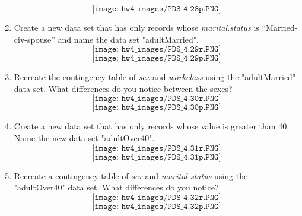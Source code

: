 \documentclass[11pt]{article}
\theoremstyle{definition}
\newcommand{\1}[1]{\mathbf{1} \left \{ #1 \right \}}
\begin{document}
\begin{enumerate}
    \[\texttt{[image: hw4\_images/PDS\_4.28p.PNG]}\]
    \item Create a new data set that has only records whose \textit{marital.status} is “Married-civ-spouse” and name the data set "adultMarried".
    \[\texttt{[image: hw4\_images/PDS\_4.29r.PNG]}\]
    \[\texttt{[image: hw4\_images/PDS\_4.29p.PNG]}\]
    \item Recreate the contingency table of \textit{sex} and \textit{workclass} using the "adultMarried" data set. What differences do you notice between the sexes?
    \[\texttt{[image: hw4\_images/PDS\_4.30r.PNG]}\]
    \[\texttt{[image: hw4\_images/PDS\_4.30p.PNG]}\]
    \item Create a new data set that has only records whose  value is greater than 40. Name the new data set "adultOver40".
    \[\texttt{[image: hw4\_images/PDS\_4.31r.PNG]}\]
    \[\texttt{[image: hw4\_images/PDS\_4.31p.PNG]}\]
    \item Recreate a contingency table of \textit{sex} and \textit{marital status} using the "adultOver40" data set. What differences do you notice?
    \[\texttt{[image: hw4\_images/PDS\_4.32r.PNG]}\]
    \[\texttt{[image: hw4\_images/PDS\_4.32p.PNG]}\]
\end{enumerate}
\end{document}
